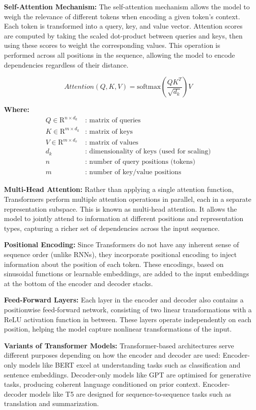 \documentclass[12pt,twoside]{report}
\begin{document}
\textbf{Self-Attention Mechanism:}
The self-attention mechanism allows the model to weigh the relevance of different tokens when encoding a given token's context. Each token is transformed into a query, key, and value vector. Attention scores are computed by taking the scaled dot-product between queries and keys, then using these scores to weight the corresponding values. This operation is performed across all positions in the sequence, allowing the model to encode dependencies regardless of their distance.

$$Attention(Q, K, V) = \text{softmax}\left(\frac{QK^T}{\sqrt{d_k}}\right)V$$

\textbf{Where:}
\[
\begin{array}{rl}
Q \in \mathrm{R}^{n \times d_k} & \text{: matrix of queries} \\
K \in \mathrm{R}^{m \times d_k} & \text{: matrix of keys} \\
V \in \mathrm{R}^{m \times d_v} & \text{: matrix of values} \\
d_k & \text{: dimensionality of keys (used for scaling)} \\
n & \text{: number of query positions (tokens)} \\
m & \text{: number of key/value positions}
\end{array}
\]


\textbf{Multi-Head Attention:}
Rather than applying a single attention function, Transformers perform multiple attention operations in parallel, each in a separate representation subspace. This is known as multi-head attention. It allows the model to jointly attend to information at different positions and representation types, capturing a richer set of dependencies across the input sequence.

\textbf{Positional Encoding:}
Since Transformers do not have any inherent sense of sequence order (unlike RNNs), they incorporate positional encoding to inject information about the position of each token. These encodings, based on sinusoidal functions or learnable embeddings, are added to the input embeddings at the bottom of the encoder and decoder stacks.

\textbf{Feed-Forward Layers:}
Each layer in the encoder and decoder also contains a positionwise feed-forward network, consisting of two linear transformations with a ReLU activation function in between. These layers operate independently on each position, helping the model capture nonlinear transformations of the input.

\textbf{Variants of Transformer Models:}
Transformer-based architectures serve different purposes depending on how the encoder and decoder are used:
Encoder-only models like BERT\cite{BERT} excel at understanding tasks such as classification and sentence embeddings.
Decoder-only models like GPT\cite{GPT} are optimised for generative tasks, producing coherent language conditioned on prior context.
Encoder-decoder models like T5\cite{T5} are designed for sequence-to-sequence tasks such as translation and summarization.
\end{document}
